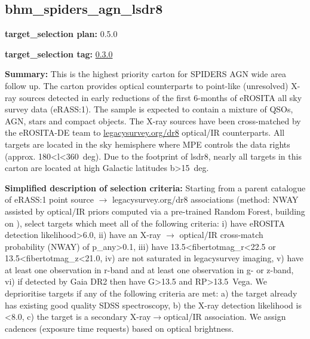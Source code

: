 \hypertarget{bhm_spiders_agn_lsdr8_plan0.5.0}{%
\subsection{bhm\_spiders\_agn\_lsdr8}\label{bhm_spiders_agn_lsdr8_plan0.5.0}}

\noindent\textbf{target\_selection plan:} 0.5.0

\noindent\textbf{target\_selection tag:}
\href{https://github.com/sdss/target_selection/tree/0.3.0/}{0.3.0}

\noindent\textbf{Summary:} This is the highest priority carton for SPIDERS AGN
wide area follow up. The carton provides optical counterparts to
point-like (unresolved) X-ray sources detected in early reductions of
the first 6-months of eROSITA all sky survey data (eRASS:1). The sample
is expected to contain a mixture of QSOs, AGN, stars and compact
objects. The X-ray sources have been cross-matched by the eROSITA-DE
team to \href{https://www.legacysurvey.org/dr8/}{legacysurvey.org/dr8}
optical/IR counterparts. All targets are located in the sky hemisphere
where MPE controls the data rights (approx.
180\textless{}l\textless{}360~deg). Due to the footprint of lsdr8,
nearly all targets in this carton are located at high Galactic latitudes
\textbar{}b\textbar{}\textgreater{}15~deg.

\noindent\textbf{Simplified description of selection criteria:} Starting from a
parent catalogue of eRASS:1 point source $\rightarrow$ legacysurvey.org/dr8
associations (method: NWAY assisted by optical/IR priors computed via a
pre-trained Random Forest, building on
\citealt{Salvato2022}), select targets which meet all of the following criteria:
i) have eROSITA detection likelihood\textgreater{}6.0, ii) have an X-ray
$\rightarrow$ optical/IR cross-match probability (NWAY) of p\_any\textgreater{}0.1,
iii) have 13.5\textless{}fibertotmag\_r\textless{}22.5 or
13.5\textless{}fibertotmag\_z\textless{}21.0, iv) are not saturated in
legacysurvey imaging, v) have at least one observation in r-band and at
least one observation in g- or z-band, vi) if detected by Gaia DR2 then
have G\textgreater{}13.5 and RP\textgreater{}13.5~Vega. We deprioritise
targets if any of the following criteria are met: a) the target already
has existing good quality SDSS spectroscopy, b) the X-ray detection
likelihood is \textless{}8.0, c) the target is a secondary
X-ray$\rightarrow$optical/IR association. We assign cadences (exposure time
requests) based on optical brightness.


